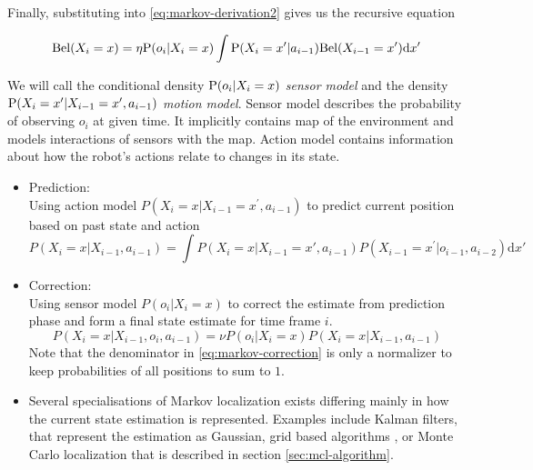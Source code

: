 Finally, substituting into \eqref{eq:markov-derivation2} gives us the recursive
equation

\begin{equation}
	\label{eq:markov-derivation5}
	\Bel(X_i = x) =
	\eta \P(o_i | X_i = x)
		\int
		\P(X_i = x' | a_{i - 1})
		\Bel(X_{i-1} = x')
		\mathrm{d}x'
\end{equation}


We will call the conditional density \(\P(o_i | X_i = x)\) \emph{sensor model} and
the density \(\P(X_i = x' | X_{i - 1}=x', a_{i - 1})\) \emph{motion model}.
Sensor model describes the probability of observing \(o_i\) at given time.
It implicitly contains map of the environment and models interactions of sensors with
the map.
Action model contains information about how the robot's actions relate to changes in its state.





\begin{itemize}
\item Prediction:\\
	Using action model \(P(X_i = x | X_{i-1} = x^\prime, a_{i - 1})\) to predict
	current position based on past state and action
	\begin{equation}
		\label{eq:markov-prediction}
		P(X_i = x | X_{i - 1}, a_{i - 1}) =
		\int
		P(X_i = x | X_{i - 1} = x', a_{i - 1})
		P(X_{i - 1} = x^\prime | o_{i - 1}, a_{i - 2})
		\mathrm{d}x'
	\end{equation}

\item Correction:\\
	Using sensor model \(P(o_i | X_i = x)\) to correct the estimate from prediction phase
	and form a final state estimate for time frame \(i\).
	\begin{equation}
		\label{eq:markov-correction}
		P(X_i = x | X_{i-1}, o_i, a_{i - 1}) =
		\nu P(o_i | X_i = x) P(X_i = x | X_{i - 1}, a_{i - 1})
	\end{equation}
	Note that the denominator in \eqref{eq:markov-correction} is only a normalizer to
	keep probabilities of all positions to sum to \(1\). 
\item Several specialisations of Markov localization exists differing mainly in how the
	current state estimation is represented.
	Examples include Kalman filters, that represent the estimation as Gaussian,
	grid based algorithms \cite{fox98}, or Monte Carlo localization
	that is described in section \ref{sec:mcl-algorithm}.
\end{itemize}

